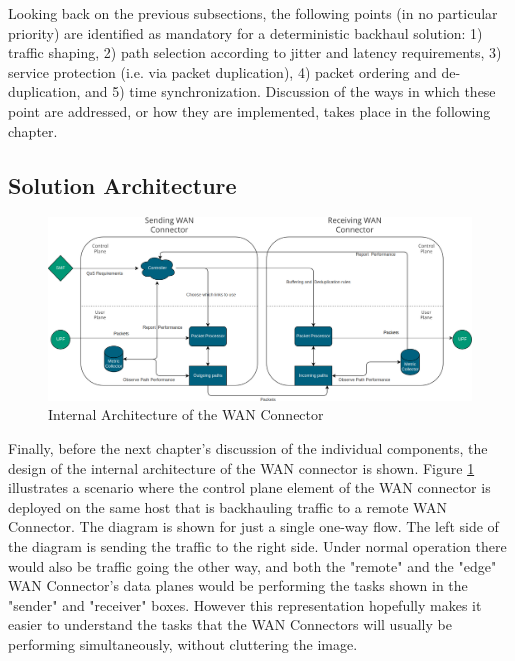 Looking back on the previous subsections, the following points (in no particular priority) are identified as mandatory for a deterministic backhaul solution: 1) traffic shaping, 2) path selection according to jitter and latency requirements, 3) service protection (i.e. via packet duplication), 4) packet ordering and de-duplication, and 5) time synchronization. Discussion of the ways in which these point are addressed, or how they are implemented, takes place in the following chapter.

\subsection{Solution Architecture}

\begin{figure}[h]
    \centering
        \includegraphics[width=\textwidth]{fig/be-architecture.png}
        \caption{Internal Architecture of the WAN Connector}
        \label{fig:arch}
\end{figure}

Finally, before the next chapter's discussion of the individual components, the design of the internal architecture of the WAN connector is shown. Figure \ref{fig:arch} illustrates a scenario where the control plane element of the WAN connector is deployed on the same host that is backhauling traffic to a remote WAN Connector. The diagram is shown for just a single one-way flow. The left side of the diagram is sending the traffic to the right side. Under normal operation there would also be traffic going the other way, and both the "remote" and the "edge" WAN Connector's data planes would be performing the tasks shown in the "sender" and "receiver" boxes. However this representation hopefully makes it easier to understand the tasks that the WAN Connectors will usually be performing simultaneously, without cluttering the image. 

